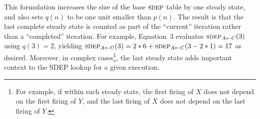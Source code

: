 This formulation increases the size of the base $\textsc{sdep}$ table by one
steady state, and also sets 
$q(n)$ to be one unit smaller than $p(n)$.  The result is that the
last complete steady state is counted as part of the ``current''
iteration rather than a ``completed'' iteration.  For example,
Equation~3 evaluates $\textsc{sdep}_{A \small{\leftarrow} C}(3)$ using $q(3)=2$, yielding
$\textsc{sdep}_{A \small{\leftarrow} C}(3) = 2*6 + \textsc{sdep}_{A \small{\leftarrow} C}(3-2*1) = 17$ as desired.
Moreover, in complex cases\footnote{{For example, if within
each steady state, the first firing of $X$ does not depend on the
first firing of $Y$, and the last firing of $X$ does not depend on the
last firing of $Y$.}}, the last steady state adds important context to
the SDEP lookup for a given execution.













